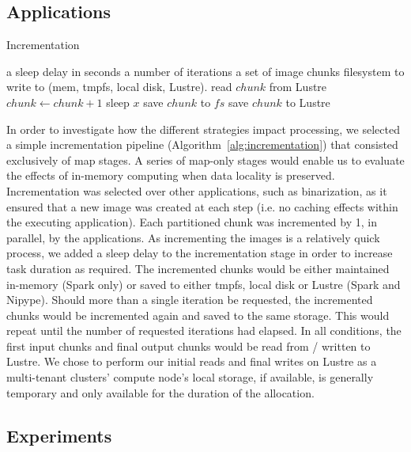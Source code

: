 \documentclass{IEEEtran}
\newcommand{\Desc}[2]{\State \makebox[2em][l]{#1}#2}
\begin{document}
\subsection{Applications} %
\begin{algorithm}\caption{Incrementation}\label{alg:incrementation}
    \begin{algorithmic}[1]
    \Input
    \Desc{$x$}{a sleep delay in seconds}
    \Desc{$n$}{a number of iterations}
    \Desc{$C$}{a set of image chunks}
    \Desc{$fs$}{filesystem to write to (mem, tmpfs, local disk, Lustre).}
    \EndInput
    \State read $chunk$ from Lustre
        \State $chunk\gets chunk+1$
        \State sleep $x$
        \State save $chunk$ to $fs$
        \EndIf
    \EndFor
    \State save $chunk$ to Lustre
    \EndFor
\end{algorithmic}
\end{algorithm}

In order to investigate how the different strategies impact processing, we 
selected a simple incrementation pipeline (Algorithm~\ref{alg:incrementation}) 
that consisted exclusively of map 
stages. A series of map-only stages would enable us to evaluate the effects of
in-memory computing when data locality is preserved. Incrementation was 
selected 
over other applications, such as binarization, as it ensured that a new image
was created at each step (i.e. no caching effects within the executing 
application). Each partitioned chunk was incremented by 1, in parallel, by
the applications. As incrementing the images is a relatively quick 
process, we added a sleep delay to the incrementation stage in order to 
increase task duration as required. The incremented chunks would be either 
maintained in-memory (Spark only) or saved to either tmpfs, local disk or 
Lustre (Spark and Nipype). Should more than a single iteration be requested, 
the incremented chunks would be incremented again and saved to the same storage. 
This would repeat until the number of requested iterations had elapsed. In all 
conditions, the first input chunks and final output chunks would be read from / written to  Lustre. 
We chose to perform our initial 
reads and final writes on Lustre as a multi-tenant clusters' compute node's 
local storage, if 
available, is generally temporary and only available for the duration of the 
allocation. 

\subsection{Experiments}
\end{document}
